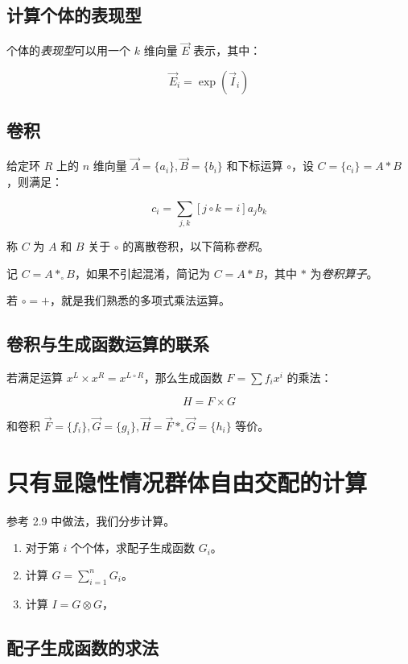 \documentclass{article}
\begin{document}
\subsection{计算个体的表现型}

个体的\textsl{表现型}可以用一个 $k$ 维向量 $\vec E$ 表示，其中：

$$\vec E_i=\operatorname{exp}(\vec I_i)$$

\subsection{卷积}

给定环 $R$ 上的 $n$ 维向量 $\vec A=\{a_i\},\vec B=\{b_i\}$ 和下标运算 $\circ$，设 $C=\{c_i\}=A*B$，则满足：

\begin{equation*}
    c_i=\sum_{j,k} [j \circ k=i] a_jb_k
\end{equation*}

称 $C$ 为 $A$ 和 $B$ 关于 $\circ$ 的离散卷积，以下简称\textsl{卷积}。

记 $C=A*_{\circ}B$，如果不引起混淆，简记为 $C=A*B$，其中 $*$ 为\textsl{卷积算子}。

若 $\circ = +$，就是我们熟悉的多项式乘法运算。

\subsection{卷积与生成函数运算的联系}

若满足运算 $x^L \times x^R = x^{L \circ R}$，那么生成函数 $F=\sum f_i x^i$ 的乘法：

$$H=F \times G$$

和卷积 $\vec F=\{f_i\},\vec G=\{g_i\},\vec H=\vec F *_{\circ} \vec G=\{h_i\}$ 等价。

\section{只有显隐性情况群体自由交配的计算}

参考 2.9 中做法，我们分步计算。

\begin{enumerate}
    \item 对于第 $i$ 个个体，求配子生成函数 $G_i$。
    \item 计算 $G=\sum_{i=1}^n G_i$。 
    \item 计算 $I=G \otimes G$，
\end{enumerate}

\subsection{配子生成函数的求法}
\end{document}
